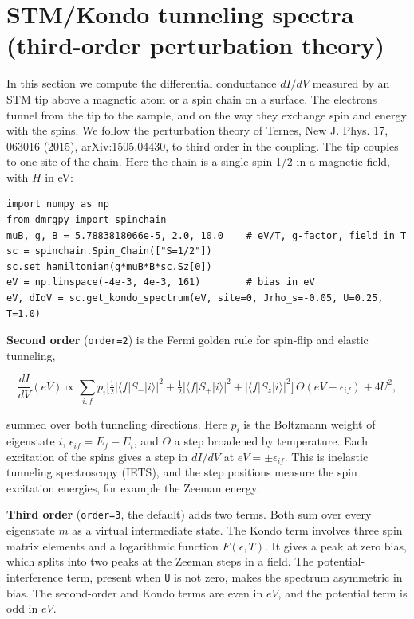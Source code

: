 \documentclass[11pt]{article}
\begin{document}
\section{STM/Kondo tunneling spectra (third-order perturbation theory)}

In this section we compute the differential conductance \(dI/dV\) measured
by an STM tip above a magnetic atom or a spin chain on a surface. The
electrons tunnel from the tip to the sample, and on the way they exchange
spin and energy with the spins. We follow the perturbation theory of
Ternes, New J. Phys. 17, 063016 (2015), arXiv:1505.04430, to third order
in the coupling. The tip couples to one site of the chain. Here the chain
is a single spin-1/2 in a magnetic field, with \(H\) in eV:

\begin{lstlisting}
import numpy as np
from dmrgpy import spinchain
muB, g, B = 5.7883818066e-5, 2.0, 10.0    # eV/T, g-factor, field in T
sc = spinchain.Spin_Chain(["S=1/2"])
sc.set_hamiltonian(g*muB*B*sc.Sz[0])
eV = np.linspace(-4e-3, 4e-3, 161)        # bias in eV
eV, dIdV = sc.get_kondo_spectrum(eV, site=0, Jrho_s=-0.05, U=0.25, T=1.0)
\end{lstlisting}

\textbf{Second order} (\texttt{order=2}) is the Fermi golden rule for spin-flip and
elastic tunneling,

\[\frac{dI}{dV}(eV)\propto\sum_{i,f}p_i\Big[\tfrac12|\langle f|S_-|i\rangle|^2+\tfrac12|\langle f|S_+|i\rangle|^2+|\langle f|S_z|i\rangle|^2\Big]\,\Theta(eV-\epsilon_{if})+4U^2,\]

summed over both tunneling directions. Here \(p_i\) is the Boltzmann weight
of eigenstate \(i\), \(\epsilon_{if}=E_f-E_i\), and \(\Theta\) a step broadened
by temperature. Each excitation of the spins gives a step in \(dI/dV\) at
\(eV=\pm\epsilon_{if}\). This is inelastic tunneling spectroscopy (IETS),
and the step positions measure the spin excitation energies, for example
the Zeeman energy.

\textbf{Third order} (\texttt{order=3}, the default) adds two terms. Both sum over
every eigenstate \(m\) as a virtual intermediate state. The Kondo term
involves three spin matrix elements and a logarithmic function
\(F(\epsilon,T)\). It gives a peak at zero bias, which splits into two
peaks at the Zeeman steps in a field. The potential-interference term,
present when \texttt{U} is not zero, makes the spectrum asymmetric in bias. The
second-order and Kondo terms are even in \(eV\), and the potential term is
odd in \(eV\).
\end{document}
